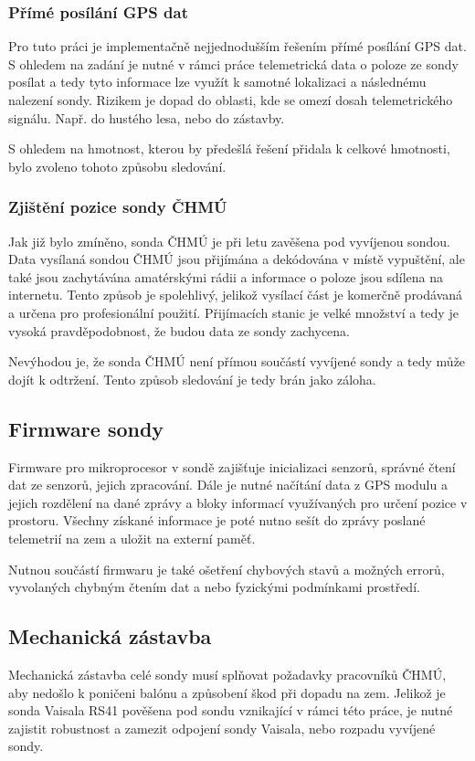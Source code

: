\documentclass[twoside]{ctuthesis}
\theoremstyle{plain}
\theoremstyle{definition}
\theoremstyle{note}
\begin{document}
				\subsubsection{Přímé posílání GPS dat}
				Pro tuto práci je implementačně nejjednodušším řešením přímé posílání GPS dat. S ohledem na zadání je nutné v rámci práce telemetrická data o poloze ze sondy posílat a tedy tyto informace lze využít k samotné lokalizaci a následnému nalezení sondy. Rizikem je dopad do oblasti, kde se omezí dosah telemetrického signálu. Např. do hustého lesa, nebo do zástavby.

				S ohledem na hmotnost, kterou by předešlá řešení přidala k celkové hmotnosti, bylo zvoleno tohoto způsobu sledování.

				\subsubsection{Zjištění pozice sondy ČHMÚ}
				Jak již bylo zmíněno, sonda ČHMÚ je při letu zavěšena pod vyvíjenou sondou. Data vysílaná sondou ČHMÚ jsou přijímána a dekódována v místě vypuštění, ale také jsou zachytávána amatérskými rádii a informace o poloze jsou sdílena na internetu. Tento způsob je spolehlivý, jelikož vysílací část je komerčně prodávaná a určena pro profesionální použití. Přijímacích stanic je velké množství a tedy je vysoká pravděpodobnost, že budou data ze sondy zachycena. 

				Nevýhodou je, že sonda ČHMÚ není přímou součástí vyvíjené sondy a tedy může dojít k odtržení. Tento způsob sledování je tedy brán jako záloha.


		
		\subsection{Firmware sondy}
		Firmware pro mikroprocesor v sondě zajišťuje inicializaci senzorů, správné čtení dat ze senzorů, jejich zpracování. Dále je nutné načítání data z GPS modulu a jejich rozdělení na dané zprávy a bloky informací využívaných pro určení pozice v prostoru. Všechny získané informace je poté nutno sešít do zprávy poslané telemetrií na zem a uložit na externí paměť. 

		Nutnou součástí firmwaru je také ošetření chybových stavů a možných errorů, vyvolaných chybným čtením dat a nebo fyzickými podmínkami prostředí.

		\subsection{Mechanická zástavba}
		Mechanická zástavba celé sondy musí splňovat požadavky pracovníků ČHMÚ, aby nedošlo k poničeni balónu a způsobení škod při dopadu na zem. Jelikož je sonda Vaisala RS41 pověšena pod sondu vznikající v rámci této práce, je nutné zajistit robustnost a zamezit odpojení sondy Vaisala, nebo rozpadu vyvíjené sondy.
\end{document}
